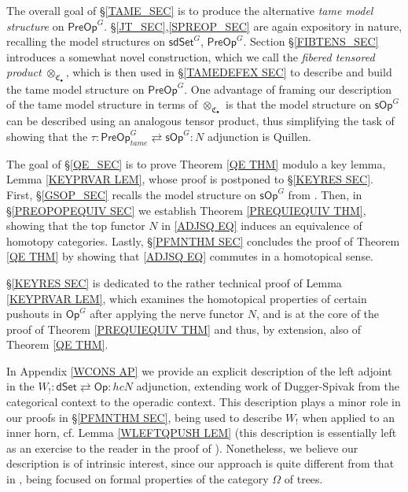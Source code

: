 \documentclass[a4paper,10pt
,draft
]{article}%
\numberwithin{equation}{section}
\numberwithin{figure}{section}
\theoremstyle{definition} %
\newcommand{\1}{\ensuremath{\mathbbm 1}}%
\begin{document}
The overall goal of \S \ref{TAME_SEC}
is to produce the alternative \emph{tame model structure}
on $\mathsf{PreOp}^G$.
\S \ref{JT_SEC},\ref{SPREOP_SEC}
are again expository in nature, 
recalling the model structures on 
$\mathsf{sdSet}^G$, 
$\mathsf{PreOp}^G$.
Section \S \ref{FIBTENS_SEC}
introduces a somewhat novel construction,
which we call the \emph{fibered tensored product}
$\otimes_{\mathfrak{C}_{\bullet}}$,
which is then used in 
\S \ref{TAMEDEFEX SEC}
to describe and build the tame model structure on 
$\mathsf{PreOp}^G$.
One advantage of framing our description 
of the tame model structure
in terms of $\otimes_{\mathfrak{C}_{\bullet}}$
is that the model structure
on $\mathsf{sOp}^G$
can be described using an analogous tensor product,
thus simplifying the task of showing that the 
$\tau \colon \mathsf{PreOp}^G_{tame}
\rightleftarrows
\mathsf{sOp}^G \colon N$
adjunction is Quillen.


The goal of \S \ref{QE_SEC} is to prove 
Theorem \ref{QE THM}
modulo a key lemma, Lemma \ref{KEYPRVAR LEM},
whose proof is postponed to \S \ref{KEYRES SEC}.
First,
\S \ref{GSOP_SEC} recalls the model structure on
$\mathsf{sOp}^G$ from \cite{BP_HGOP}.
Then, in 
\S \ref{PREOPOPEQUIV SEC}
we establish Theorem \ref{PREQUIEQUIV THM},
showing that the top functor $N$ in 
\eqref{ADJSQ EQ}
induces an equivalence of homotopy categories.
Lastly, \S \ref{PFMNTHM SEC}
concludes the proof of Theorem \ref{QE THM}
by showing that
\eqref{ADJSQ EQ}
commutes in a homotopical sense.


\S \ref{KEYRES SEC}
is dedicated to the rather technical proof of 
Lemma \ref{KEYPRVAR LEM},
which examines the homotopical properties
of certain pushouts in 
$\mathsf{Op}^G$
after applying the nerve functor
$N$, %
and is at the core of the proof of 
Theorem \ref{PREQUIEQUIV THM}
and thus, by extension, 
also of Theorem \ref{QE THM}.


In Appendix \ref{WCONS AP}
we provide an explicit description of the left adjoint
in the 
$W_! 
\colon 
\mathsf{dSet} 
\rightleftarrows 
\mathsf{Op}
\colon 
hcN$
adjunction,
extending work of Dugger-Spivak \cite{DS11}
from the categorical context to the operadic context.
This description plays a minor role in our proofs 
in \S \ref{PFMNTHM SEC},
being used to describe
$W_!$ when applied to an inner horn,
cf. Lemma \ref{WLEFTQPUSH LEM}
(this description is essentially left as an exercise to the reader in the proof of \cite[Prop. 4.5]{CM13b}).
Nonetheless, we believe our description is of intrinsic interest,
since our approach is quite different from that in \cite{DS11},
being focused on formal properties of the category
$\Omega$ of trees.
\end{document}
